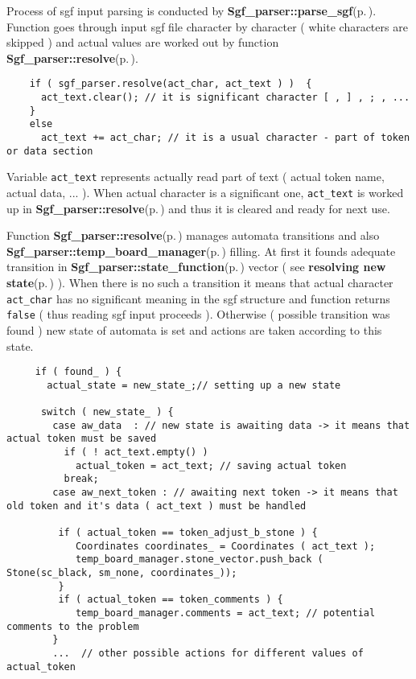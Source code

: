 Process of sgf input parsing is conducted by {\bf Sgf\_\-parser::parse\_\-sgf}{\rm (p.\,\pageref{classSgf__parser_a5})}. Function goes through input sgf file character by character ( white characters are skipped ) and actual values are worked out by function {\bf Sgf\_\-parser::resolve}{\rm (p.\,\pageref{classSgf__parser_a4})}.



\footnotesize\begin{verbatim}    if ( sgf_parser.resolve(act_char, act_text ) )  { 
      act_text.clear(); // it is significant character [ , ] , ; , ...  
    }
    else              
      act_text += act_char; // it is a usual character - part of token or data section    
\end{verbatim}
\normalsize


Variable {\tt act\_\-text} represents actually read part of text ( actual token name, actual data, ... ). When actual character is a significant one, {\tt act\_\-text} is worked up in {\bf Sgf\_\-parser::resolve}{\rm (p.\,\pageref{classSgf__parser_a4})} and thus it is cleared and ready for next use.

Function {\bf Sgf\_\-parser::resolve}{\rm (p.\,\pageref{classSgf__parser_a4})} manages automata transitions and also {\bf Sgf\_\-parser::temp\_\-board\_\-manager}{\rm (p.\,\pageref{classSgf__parser_r12})} filling. At first it founds adequate transition in {\bf Sgf\_\-parser::state\_\-function}{\rm (p.\,\pageref{classSgf__parser_r1})} vector ( see {\bf resolving new state}{\rm (p.\,\pageref{page_5_page_5__resolving_new_state})} ). When there is no such a transition it means that actual character {\tt act\_\-char} has no significant meaning in the sgf structure and function returns {\tt false} ( thus reading sgf input proceeds ). Otherwise ( possible transition was found ) new state of automata is set and actions are taken according to this state.



\footnotesize\begin{verbatim}     if ( found_ ) {
       actual_state = new_state_;// setting up a new state 
        
      switch ( new_state_ ) {
        case aw_data  : // new state is awaiting data -> it means that actual token must be saved
          if ( ! act_text.empty() ) 
            actual_token = act_text; // saving actual token
          break;
        case aw_next_token : // awaiting next token -> it means that old token and it's data ( act_text ) must be handled
        
         if ( actual_token == token_adjust_b_stone ) { 
            Coordinates coordinates_ = Coordinates ( act_text );
            temp_board_manager.stone_vector.push_back ( Stone(sc_black, sm_none, coordinates_));
         }  
         if ( actual_token == token_comments ) {
            temp_board_manager.comments = act_text; // potential comments to the problem
        }
        ...  // other possible actions for different values of actual_token 
\end{verbatim}
\normalsize


